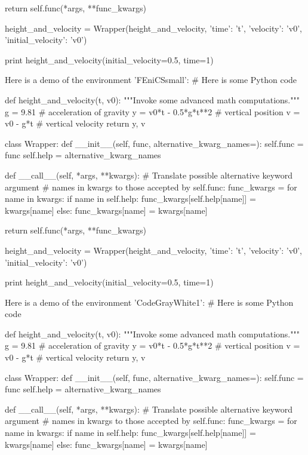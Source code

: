         return self.func(*args, **func_kwargs)

height_and_velocity = Wrapper(height_and_velocity,
                              {'time': 't',
                               'velocity': 'v0',
                               'initial_velocity': 'v0'})

print height_and_velocity(initial_velocity=0.5, time=1)


\noindent
Here is a demo of the environment 'FEniCSsmall':
# Here is some Python code

def height_and_velocity(t, v0):
    """Invoke some advanced math computations."""
    g = 9.81                  # acceleration of gravity
    y = v0*t - 0.5*g*t**2     # vertical position
    v = v0 - g*t              # vertical velocity
    return y, v

class Wrapper:
    def __init__(self, func, alternative_kwarg_names={}):
        self.func = func
        self.help = alternative_kwarg_names

    def __call__(self, *args, **kwargs):
        # Translate possible alternative keyword argument
        # names in kwargs to those accepted by self.func:
        func_kwargs = {}
        for name in kwargs:
            if name in self.help:
                func_kwargs[self.help[name]] = kwargs[name]
            else:
                func_kwargs[name] = kwargs[name]

        return self.func(*args, **func_kwargs)

height_and_velocity = Wrapper(height_and_velocity,
                              {'time': 't',
                               'velocity': 'v0',
                               'initial_velocity': 'v0'})

print height_and_velocity(initial_velocity=0.5, time=1)


\noindent
Here is a demo of the environment 'CodeGrayWhite1':
# Here is some Python code

def height_and_velocity(t, v0):
    """Invoke some advanced math computations."""
    g = 9.81                  # acceleration of gravity
    y = v0*t - 0.5*g*t**2     # vertical position
    v = v0 - g*t              # vertical velocity
    return y, v

class Wrapper:
    def __init__(self, func, alternative_kwarg_names={}):
        self.func = func
        self.help = alternative_kwarg_names

    def __call__(self, *args, **kwargs):
        # Translate possible alternative keyword argument
        # names in kwargs to those accepted by self.func:
        func_kwargs = {}
        for name in kwargs:
            if name in self.help:
                func_kwargs[self.help[name]] = kwargs[name]
            else:
                func_kwargs[name] = kwargs[name]

